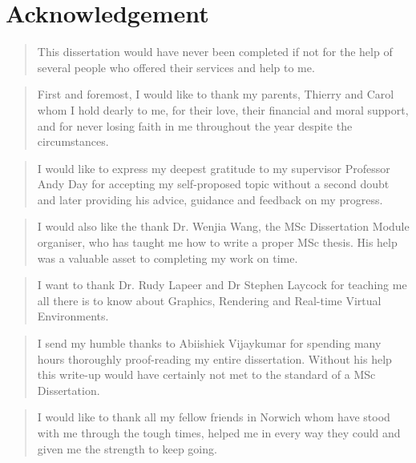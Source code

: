 \documentclass[a4paper]{report}
\begin{document}
\chapter*{Acknowledgement}
\begin{quotation}
This dissertation would have never been completed if not for the help of several people who offered their services and help to me.
\end{quotation}
\begin{quotation}
First and foremost, I would like to thank my parents, Thierry and Carol whom I hold dearly to me, for their love, their financial and moral support, and for never losing faith in me throughout the year despite the circumstances.
\end{quotation}
\begin{quotation}
I would like to express my deepest gratitude to my supervisor Professor Andy Day for accepting my self-proposed topic without a second doubt and later providing his advice, guidance and feedback on my progress.
\end{quotation}
\begin{quotation}
I would also like the thank Dr. Wenjia Wang, the MSc Dissertation Module organiser, who has taught me how to write a proper MSc thesis. His help was a valuable asset to completing my work on time. 
\end{quotation}
\begin{quotation}
I want to thank Dr. Rudy Lapeer and Dr Stephen Laycock for teaching me all there is to know about Graphics, Rendering and Real-time Virtual Environments.
\end{quotation}
\begin{quotation}
I send my humble thanks to Abiishiek Vijaykumar for spending many hours thoroughly proof-reading my entire dissertation. Without his help this write-up would have certainly not met to the standard of a MSc Dissertation.
\end{quotation}
\begin{quotation}
I would like to thank all my fellow friends in Norwich whom have stood with me through the tough times, helped me in every way they could and given me the strength to keep going.
\end{quotation}

\pagebreak
\tableofcontents
\pagebreak

\setcounter{page}{1}









\pagebreak
{}



\pagebreak
\appendix

\end{document}
